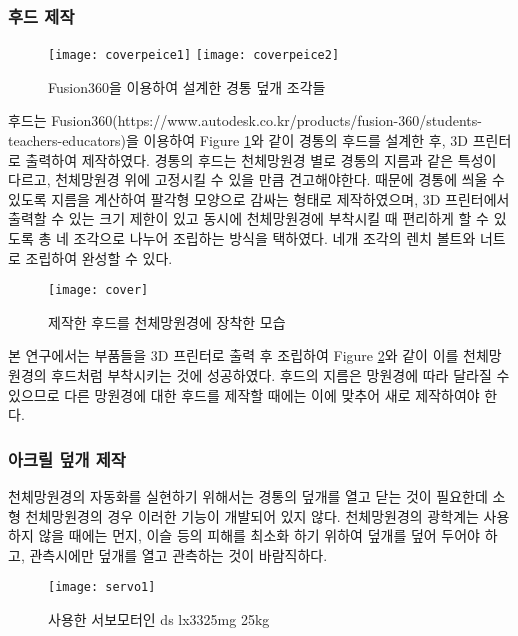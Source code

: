 \subsubsection{후드 제작}

\begin{figure}[h]
	\begin{center}
		\texttt{[image: coverpeice1]}
		\texttt{[image: coverpeice2]}
	\end{center}
	\caption{Fusion360을 이용하여 설계한 경통 덮개 조각들}
	\label{coverpeice}
\end{figure}

후드는 Fusion360(https://www.autodesk.co.kr/products/fusion-360/students-teachers-educators)을 이용하여 \textrm{Figure} \ref{coverpeice}와 같이 경통의 후드를 설계한 후, 3D 프린터로 출력하여 제작하였다. 경통의 후드는 천체망원경 별로 경통의 지름과 같은 특성이 다르고, 천체망원경 위에 고정시킬 수 있을 만큼 견고해야한다. 때문에 경통에 씌울 수 있도록 지름을 계산하여 팔각형 모양으로 감싸는 형태로 제작하였으며, 3D 프린터에서 출력할 수 있는 크기 제한이 있고 동시에 천체망원경에 부착시킬 때 편리하게 할 수 있도록 총 네 조각으로 나누어 조립하는 방식을 택하였다. 네개 조각의 렌치 볼트와 너트로 조립하여 완성할 수 있다.


\begin{figure}[h]
	\begin{center}
		\texttt{[image: cover]}
	\end{center}
	\caption{제작한 후드를 천체망원경에 장착한 모습}
	\label{cover}
\end{figure}

본 연구에서는 부품들을 3D 프린터로 출력 후 조립하여 \textrm{Figure} \ref{cover}와 같이 이를 천체망원경의 후드처럼 부착시키는 것에 성공하였다. 후드의 지름은 망원경에 따라 달라질 수 있으므로 다른 망원경에 대한 후드를 제작할 때에는 이에 맞추어 새로 제작하여야 한다.

\subsubsection{아크릴 덮개 제작}

천체망원경의 자동화를 실현하기 위해서는 경통의 덮개를 열고 닫는 것이 필요한데 소형 천체망원경의 경우 이러한 기능이 개발되어 있지 않다. 천체망원경의 광학계는 사용하지 않을 때에는 먼지, 이슬 등의 피해를 최소화 하기 위하여 덮개를 덮어 두어야 하고, 관측시에만 덮개를 열고 관측하는 것이 바람직하다. 
\begin{figure}[h]
	\begin{center}
		\texttt{[image: servo1]}
	\end{center}
	\caption{사용한 서보모터인 ds lx3325mg 25kg}
	\label{motor}
\end{figure}


